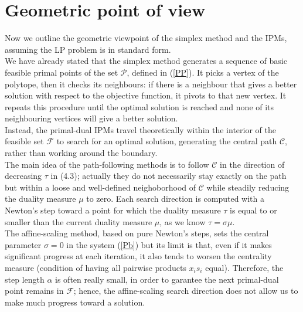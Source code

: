 \documentclass[a4paper,10 pt,titlepage,twoside]{book}
\theoremstyle{plain}
\theoremstyle{definition}
\theoremstyle{remark}
\begin{document}
{{\section*{Geometric point of view}
Now we outline the geometric viewpoint of the simplex method and the IPMs, assuming the LP problem is in standard form.\\
We have already stated that the simplex method generates a sequence of basic feasible primal points of the set $\mathcal{P}$, defined in (\ref{PP}). It picks a vertex of the polytope, then it checks its neighbours: if there is a neighbour that gives a
better solution with respect to the objective function, it pivots to that new vertex.
It repeats this procedure until the optimal solution is reached and none of its neighbouring vertices will give
a better solution.\\Instead, the primal-dual IPMs travel theoretically within the interior of the feasible set $\mathcal{F}$ to search for an optimal solution, generating the central path $\mathcal{C}$, rather than working around the boundary.\\ The main idea of the path-following methods is to follow $\mathcal{C}$ in the direction of decreasing $\tau$ in (4.3); actually they do not necessarily stay exactly on the path but within a loose and well-defined neighoborhood of $\mathcal{C}$ while steadily reducing the duality measure $\mu$ to zero. Each search direction is computed with a Newton's step toward a point for which the duality measure $\tau$ is equal to or smaller than the current duality measure $\mu$, as we know $\tau=\sigma\mu$. \\
The affine-scaling method, based on pure Newton's steps, sets the central parameter $\sigma= 0$ in the system (\ref{Pb}) but its limit is that,
even if it makes significant progress at each iteration, it also tends to worsen the centrality measure (condition of having all pairwise products $x_{i}s_{i}$ equal). Therefore, the step length $\alpha$ is often really small, in order to garantee the next primal-dual point remains in $\mathcal{F}$; hence, the affine-scaling search direction does not allow us to make much progress toward a solution.\\ 
}}
\end{document}
